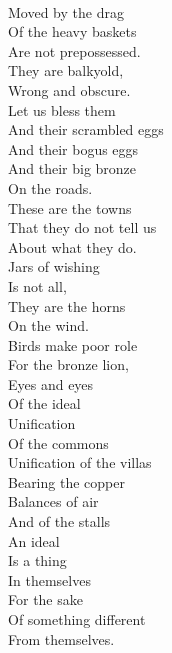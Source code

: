\documentclass[smalldemyvopaper,11pt,twoside,onecolumn,openright,extrafontsizes]{memoir}
\begin{document}
\\Moved by the drag
\\Of the heavy baskets
\\Are not prepossessed.
\\They are balkyold,
\\Wrong and obscure.
\\Let us bless them
\\And their scrambled eggs
\\And their bogus eggs
\\And their big bronze
\\On the roads.
\\These are the towns
\\That they do not tell us
\\About what they do.
\\Jars of wishing
\\Is not all,
\\They are the horns
\\On the wind.
\\Birds make poor role
\\For the bronze lion,
\\Eyes and eyes
\\Of the ideal
\\Unification
\\Of the commons
\\Unification of the villas
\\Bearing the copper
\\Balances of air
\\And of the stalls
\\An ideal
\\Is a thing
\\In themselves
\\For the sake
\\Of something different
\\From themselves.
\end{document}
